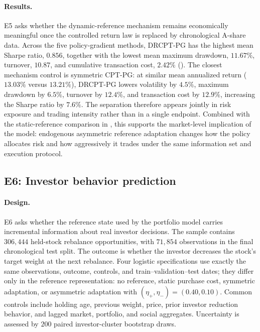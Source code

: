 \paragraph{Results.}
E5 asks whether the dynamic-reference mechanism remains economically meaningful once the controlled return law is replaced by chronological A-share data.  Across the five policy-gradient methods, DRCPT-PG has the highest mean Sharpe ratio, $0.856$, together with the lowest mean maximum drawdown, $11.67\%$, turnover, $10.87$, and cumulative transaction cost, $2.42\%$ ().  The closest mechanism control is symmetric CPT-PG: at similar mean annualized return ($13.03\%$ versus $13.21\%$), DRCPT-PG lowers volatility by $4.5\%$, maximum drawdown by $6.5\%$, turnover by $12.4\%$, and transaction cost by $12.9\%$, increasing the Sharpe ratio by $7.6\%$.  The separation therefore appears jointly in risk exposure and trading intensity rather than in a single endpoint.  Combined with the static-reference comparison in , this supports the market-level implication of the model: endogenous asymmetric reference adaptation changes how the policy allocates risk and how aggressively it trades under the same information set and execution protocol.

\subsection{E6: Investor behavior prediction}\label{sec:e6}
\paragraph{Design.}
E6 asks whether the reference state used by the portfolio model carries incremental information about real investor decisions.  The sample contains $306{,}444$ held-stock rebalance opportunities, with $71{,}854$ observations in the final chronological test split.  The outcome is whether the investor decreases the stock's target weight at the next rebalance.  Four logistic specifications use exactly the same observations, outcome, controls, and train--validation--test dates; they differ only in the reference representation: no reference, static purchase cost, symmetric adaptation, or asymmetric adaptation with $(\eta_+,\eta_-)=(0.40,0.10)$.  Common controls include holding age, previous weight, price, prior investor reduction behavior, and lagged market, portfolio, and social aggregates.  Uncertainty is assessed by $200$ paired investor-cluster bootstrap draws.


